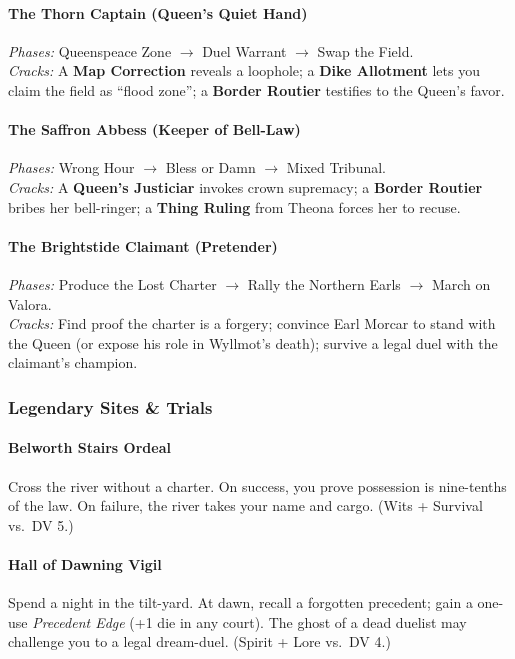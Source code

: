 \begin{itemize}[nosep]
\paragraph{The Thorn Captain (Queen's Quiet Hand)}
\emph{Phases:} Queenspeace Zone $\rightarrow$ Duel Warrant $\rightarrow$ Swap the Field.\\
\emph{Cracks:} A \textbf{Map Correction} reveals a loophole; a \textbf{Dike Allotment} lets you claim the field as ``flood zone''; a \textbf{Border Routier} testifies to the Queen's favor.

\paragraph{The Saffron Abbess (Keeper of Bell-Law)}
\emph{Phases:} Wrong Hour $\rightarrow$ Bless or Damn $\rightarrow$ Mixed Tribunal.\\
\emph{Cracks:} A \textbf{Queen's Justiciar} invokes crown supremacy; a \textbf{Border Routier} bribes her bell-ringer; a \textbf{Thing Ruling} from Theona forces her to recuse.

\paragraph{The Brightstide Claimant (Pretender)}
\emph{Phases:} Produce the Lost Charter $\rightarrow$ Rally the Northern Earls $\rightarrow$ March on Valora.\\
\emph{Cracks:} Find proof the charter is a forgery; convince Earl Morcar to stand with the Queen (or expose his role in Wyllmot's death); survive a legal duel with the claimant's champion.

\subsubsection{Legendary Sites \& Trials}

\paragraph{Belworth Stairs Ordeal}
Cross the river without a charter. On success, you prove possession is nine-tenths of the law. On failure, the river takes your name and cargo. (Wits + Survival vs.\ DV 5.)

\paragraph{Hall of Dawning Vigil}
Spend a night in the tilt-yard. At dawn, recall a forgotten precedent; gain a one-use \emph{Precedent Edge} (+1 die in any court). The ghost of a dead duelist may challenge you to a legal dream-duel. (Spirit + Lore vs.\ DV 4.)


\end{itemize}
